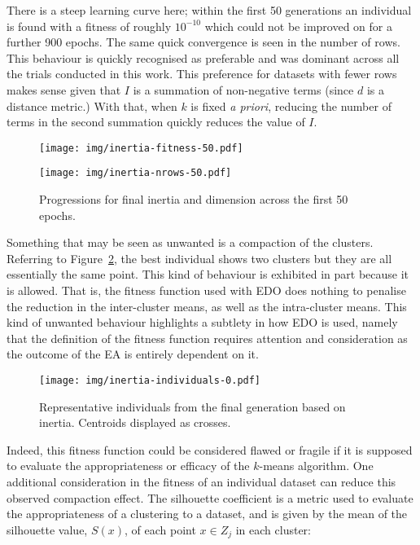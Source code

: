There is a steep learning curve here; within the first 50 generations an
individual is found with a fitness of roughly \(10^{-10}\) which could not be
improved on for a further 900 epochs. The same quick convergence is seen in the
number of rows. This behaviour is quickly recognised as preferable and was
dominant across all the trials conducted in this work. This preference for
datasets with fewer rows makes sense given that \(I\) is a summation of
non-negative terms (since \(d\) is a distance metric.) With that, when \(k\) is
fixed \textit{a priori}, reducing the number of terms in the second summation
quickly reduces the value of \(I\). 

\begin{figure}[htbp]
    \centering
    \begin{minipage}{\imgwidth}
        \centering
        \texttt{[image: img/inertia-fitness-50.pdf]}
    \end{minipage}

    \begin{minipage}{\imgwidth}
        \centering
        \texttt{[image: img/inertia-nrows-50.pdf]}
    \end{minipage}
    \caption{Progressions for final inertia and dimension across the first 50
             epochs.}\label{figure:inertia-50}
\end{figure}

Something that may be seen as unwanted is a compaction of the clusters.
Referring to Figure~\ref{figure:inertia-individuals}, the best individual shows
two clusters but they are all essentially the same point. This kind of behaviour
is exhibited in part because it is allowed. That is, the fitness function used
with EDO does nothing to penalise the reduction in the inter-cluster means, as
well as the intra-cluster means. This kind of unwanted behaviour highlights a
subtlety in how EDO is used, namely that the definition of the fitness function
requires attention and consideration as the outcome of the EA is entirely
dependent on it.

\begin{figure}[htbp]
    \centering
    \texttt{[image: img/inertia-individuals-0.pdf]}
    \caption{Representative individuals from the final generation based on
             inertia. Centroids displayed as
             crosses.}\label{figure:inertia-individuals}
\end{figure}

Indeed, this fitness function could be considered flawed or fragile if it is
supposed to evaluate the appropriateness or efficacy of the \(k\)-means
algorithm. One additional consideration in the fitness of an individual dataset
can reduce this observed compaction effect. The silhouette coefficient is a
metric used to evaluate the appropriateness of a clustering to a dataset, and is
given by the mean of the silhouette value, \(S(x)\), of each point \(x \in Z_j\)
in each cluster:

